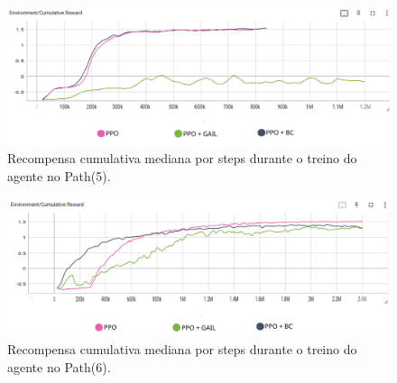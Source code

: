 \begin{figure}[h]
    \centering
    \includegraphics[scale=0.35]{figs/treinos/desafio-dificil/path-5_recompensas-algos.png}
    \caption{Recompensa cumulativa mediana por steps durante o treino do agente no Path(5).}
\end{figure}

\begin{figure}[h]
    \centering
    \includegraphics[scale=0.35]{figs/treinos/desafio-dificil/path-6_recompensas-algos.png}
    \caption{Recompensa cumulativa mediana por steps durante o treino do agente no Path(6).}
\end{figure}

